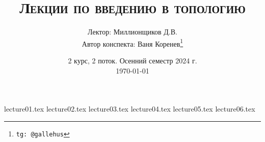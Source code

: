 \documentclass[a4paper]{article}
\title{\scshape {Лекции по введению в топологию}}
\date{2 курс, 2 поток. Осенний семестр 2024 г. \\ \today}
\author{Лектор: Миллионщиков Д.В. \\ Автор конспекта: Ваня Коренев\thanks{\texttt{tg: @gallehus}}}
\begin{document}
\maketitle
\newpage
\tableofcontents

\newpage

{lecture01.tex}
{lecture02.tex}
{lecture03.tex}
{lecture04.tex}
{lecture05.tex}
{lecture06.tex}
\end{document}
